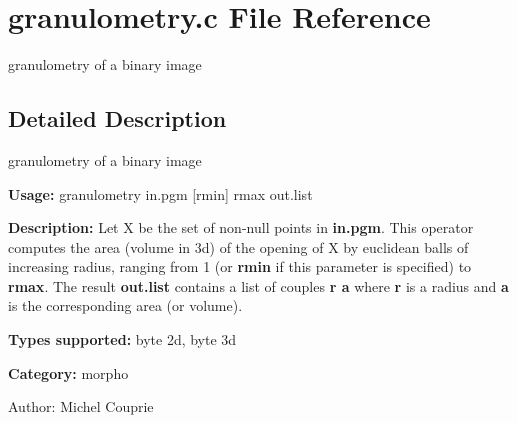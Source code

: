 \section{granulometry.c File Reference}
\label{granulometry_8c}
granulometry of a binary image 



\subsection{Detailed Description}
granulometry of a binary image 

{\bf Usage:} granulometry in.pgm [rmin] rmax out.list

{\bf Description:} Let X be the set of non-null points in {\bf in.pgm}. This operator computes the area (volume in 3d) of the opening of X by euclidean balls of increasing radius, ranging from 1 (or {\bf rmin} if this parameter is specified) to {\bf rmax}. The result {\bf out.list} contains a list of couples {\bf r a} where {\bf r} is a radius and {\bf a} is the corresponding area (or volume).

{\bf Types supported:} byte 2d, byte 3d

{\bf Category:} morpho

\begin{Desc}
\item[Author:]Michel Couprie \end{Desc}
